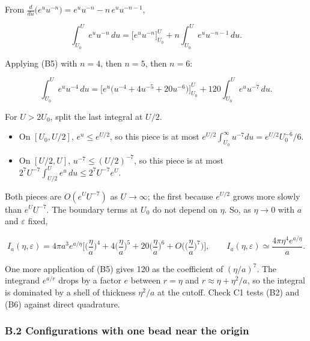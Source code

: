\documentclass[11pt,a4paper]{article}
\providecommand{\tightlist}{\setlength{\itemsep}{0pt}\setlength{\parskip}{0pt}}
\begin{document}
From \(\frac{d}{du}\big(e^uu^{-n}\big)=e^uu^{-n}-n\,e^uu^{-n-1}\),

\begin{equation}
\int_{U_0}^{U}e^uu^{-n}\,du=\Big[e^uu^{-n}\Big]_{U_0}^{U}+n\int_{U_0}^{U}e^uu^{-n-1}\,du.\tag{B5}
\end{equation}

Applying (B5) with \(n=4\), then \(n=5\), then \(n=6\):

\[
\int_{U_0}^{U}e^uu^{-4}\,du=\Big[e^u\big(u^{-4}+4u^{-5}+20u^{-6}\big)\Big]_{U_0}^{U}+120\int_{U_0}^{U}e^uu^{-7}\,du .
\]

For \(U>2U_0\), split the last integral at \(U/2\).

\begin{itemize}
\tightlist
\item
  On \([U_0,U/2]\), \(e^u\le e^{U/2}\), so this piece is at most \(e^{U/2}\int_{U_0}^{\infty}u^{-7}du=e^{U/2}U_0^{-6}/6\).
\item
  On \([U/2,U]\), \(u^{-7}\le(U/2)^{-7}\), so this piece is at most \(2^7U^{-7}\int_{U/2}^{U}e^u\,du\le2^7U^{-7}e^U\).
\end{itemize}

Both pieces are \(O(e^UU^{-7})\) as \(U\to\infty\); the first because \(e^{U/2}\) grows more slowly than \(e^UU^{-7}\). The boundary terms at \(U_0\) do not depend on \(\eta\). So, as \(\eta\to0\) with \(a\) and \(\varepsilon\) fixed,

\begin{equation}
I_a(\eta,\varepsilon)=4\pi a^3e^{a/\eta}\Big[\Big(\frac{\eta}{a}\Big)^4+4\Big(\frac{\eta}{a}\Big)^5+20\Big(\frac{\eta}{a}\Big)^6+O\Big(\Big(\frac{\eta}{a}\Big)^7\Big)\Big],\qquad I_a(\eta,\varepsilon)\simeq\frac{4\pi\eta^4e^{a/\eta}}{a}.\tag{B6}
\end{equation}

One more application of (B5) gives 120 as the coefficient of \((\eta/a)^7\). The integrand \(e^{a/r}\) drops by a factor \(e\) between \(r=\eta\) and \(r\approx\eta+\eta^2/a\), so the integral is dominated by a shell of thickness \(\eta^2/a\) at the cutoff. Check C1 tests (B2) and (B6) against direct quadrature.

\hypertarget{b.2-configurations-with-one-bead-near-the-origin}{%
\subsubsection{B.2 Configurations with one bead near the origin}\label{b.2-configurations-with-one-bead-near-the-origin}}
\end{document}
